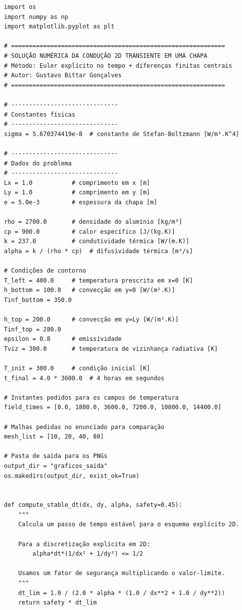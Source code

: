 \documentclass[12pt,a4paper]{article}
\begin{document}
\lstset{style=pythonstyle}
\begin{lstlisting}
import os
import numpy as np
import matplotlib.pyplot as plt

# ============================================================
# SOLUÇÃO NUMÉRICA DA CONDUÇÃO 2D TRANSIENTE EM UMA CHAPA
# Método: Euler explícito no tempo + diferenças finitas centrais
# Autor: Gustavo Bittar Gonçalves
# ============================================================

# ------------------------------
# Constantes físicas
# ------------------------------
sigma = 5.670374419e-8  # constante de Stefan-Boltzmann [W/m².K^4]

# ------------------------------
# Dados do problema
# ------------------------------
Lx = 1.0           # comprimento em x [m]
Ly = 1.0           # comprimento em y [m]
e = 5.0e-3         # espessura da chapa [m]

rho = 2700.0       # densidade do alumínio [kg/m³]
cp = 900.0         # calor específico [J/(kg.K)]
k = 237.0          # condutividade térmica [W/(m.K)]
alpha = k / (rho * cp)  # difusividade térmica [m²/s]

# Condições de contorno
T_left = 400.0     # temperatura prescrita em x=0 [K]
h_bottom = 100.0   # convecção em y=0 [W/(m².K)]
Tinf_bottom = 350.0

h_top = 200.0      # convecção em y=Ly [W/(m².K)]
Tinf_top = 280.0
epsilon = 0.8      # emissividade
Tviz = 300.0       # temperatura de vizinhança radiativa [K]

T_init = 300.0     # condição inicial [K]
t_final = 4.0 * 3600.0  # 4 horas em segundos

# Instantes pedidos para os campos de temperatura
field_times = [0.0, 1800.0, 3600.0, 7200.0, 10800.0, 14400.0]

# Malhas pedidas no enunciado para comparação
mesh_list = [10, 20, 40, 80]

# Pasta de saída para os PNGs
output_dir = "graficos_saida"
os.makedirs(output_dir, exist_ok=True)


def compute_stable_dt(dx, dy, alpha, safety=0.45):
    """
    Calcula um passo de tempo estável para o esquema explícito 2D.

    Para a discretização explícita em 2D:
        alpha*dt*(1/dx² + 1/dy²) <= 1/2

    Usamos um fator de segurança multiplicando o valor-limite.
    """
    dt_lim = 1.0 / (2.0 * alpha * (1.0 / dx**2 + 1.0 / dy**2))
    return safety * dt_lim



\end{lstlisting}
\end{document}
